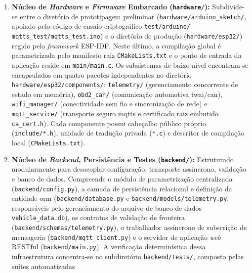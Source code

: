 \documentclass[
	12pt,				%
	openright,			%
	twoside,			%
	a4paper,			%
	english,			%
	brazil				%
	]{abntex2}
\begin{document}
\begin{enumerate}
    \item \textbf{Núcleo de \textit{Hardware} e \textit{Firmware} Embarcado
        (\texttt{hardware/}):} Subdivide-se entre o diretório de prototipagem preliminar
        (\texttt{hardware/\allowbreak arduino\_sketch/}, apoiado pelo código de ensaio
        criptográfico \texttt{test/\allowbreak arduino/\allowbreak
        mqtts\_test/\allowbreak mqtts\_test.ino}) e o diretório de produção
        (\texttt{hardware/\allowbreak esp32/}) regido pelo \textit{framework} ESP-IDF.
        Neste último, a compilação global é parametrizada pelo manifesto raiz
        \texttt{CMakeLists.txt} e o ponto de entrada da aplicação reside em
        \texttt{main/\allowbreak main.c}. Os subsistemas de baixo nível encontram-se
        encapsulados em quatro pacotes independentes no diretório
        \texttt{hardware/\allowbreak esp32/\allowbreak components/}: \texttt{telemetry/}
        (gerenciamento concorrente de estado em memória), \texttt{obd2\_can/}
        (comunicação automotiva \acrshort{twai}/\acrshort{can}), \texttt{wifi\_manager/}
        (conectividade sem fio e sincronização de rede) e \texttt{mqtt\_service/}
        (transporte seguro \acrshort{mqtts} e certificado raiz embutido
        \texttt{ca\_cert.h}). Cada componente possui cabeçalho público próprio
        (\texttt{include/*.h}), unidade de tradução privada (\texttt{*.c}) e descritor
        de compilação local (\texttt{CMakeLists.txt}).
    \item \textbf{Núcleo de \textit{Backend}, Persistência e Testes
        (\texttt{backend/}):} Estruturado modularmente para desacoplar configuração,
        transporte assíncrono, validação e banco de dados. Compreende o módulo de
        parametrização centralizada (\texttt{backend/\allowbreak config.py}), a camada
        de persistência relacional e definição da entidade \acrshort{orm}
        (\texttt{backend/\allowbreak database.py} e
        \texttt{backend/\allowbreak models/\allowbreak telemetry.py}, responsáveis pelo
        gerenciamento do arquivo de banco de dados \texttt{vehicle\_data.db}), os
        contratos de validação de fronteira
        (\texttt{backend/\allowbreak schemas/\allowbreak telemetry.py}), o trabalhador
        assíncrono de subscrição de mensageria
        (\texttt{backend/\allowbreak mqtt\_client.py}) e o servidor de aplicação
        \textit{web} RESTful (\texttt{backend/\allowbreak main.py}). A verificação
        determinística dessa infraestrutura concentra-se no subdiretório
        \texttt{backend/\allowbreak tests/}, composto pelas suítes automatizadas

\end{enumerate}
\end{document}
